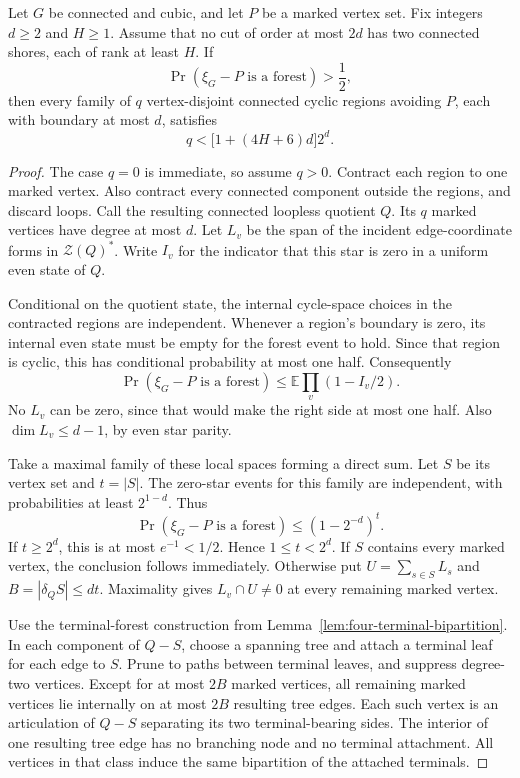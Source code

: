 \begin{proposition}
\label{prop:four-excess-free-cycle-packing}
Let $G$ be connected and cubic, and let $P$ be a marked vertex set.
Fix integers $d\ge2$ and $H\ge1$.
Assume that no cut of order at most $2d$ has two connected shores, each of rank at least $H$.
If
\[
 \Pr(\xi_G-P\text{ is a forest})>\frac12,
\]
then every family of $q$ vertex-disjoint connected cyclic regions avoiding $P$, each with boundary at most $d$, satisfies
\[
 q<\bigl[1+(4H+6)d\bigr]2^d.
\]
\end{proposition}

\begin{proof}
The case $q=0$ is immediate, so assume $q>0$.
Contract each region to one marked vertex.
Also contract every connected component outside the regions, and discard loops.
Call the resulting connected loopless quotient $Q$.
Its $q$ marked vertices have degree at most $d$.
Let $L_v$ be the span of the incident edge-coordinate forms in $\mathcal Z(Q)^*$.
Write $I_v$ for the indicator that this star is zero in a uniform even state of $Q$.

Conditional on the quotient state, the internal cycle-space choices in the contracted regions are independent.
Whenever a region's boundary is zero, its internal even state must be empty for the forest event to hold.
Since that region is cyclic, this has conditional probability at most one half.
Consequently
\[
 \Pr(\xi_G-P\text{ is a forest})
 \le\mathbb E\prod_v(1-I_v/2).
\]
No $L_v$ can be zero, since that would make the right side at most one half.
Also $\dim L_v\le d-1$, by even star parity.

Take a maximal family of these local spaces forming a direct sum.
Let $S$ be its vertex set and $t=|S|$.
The zero-star events for this family are independent, with probabilities at least $2^{1-d}$.
Thus
\[
 \Pr(\xi_G-P\text{ is a forest})
 \le(1-2^{-d})^t.
\]
If $t\ge2^d$, this is at most $e^{-1}<1/2$.
Hence $1\le t<2^d$.
If $S$ contains every marked vertex, the conclusion follows immediately.
Otherwise put $U=\sum_{s\in S}L_s$ and $B=|\delta_Q S|\le dt$.
Maximality gives $L_v\cap U\ne0$ at every remaining marked vertex.

Use the terminal-forest construction from Lemma~\ref{lem:four-terminal-bipartition}.
In each component of $Q-S$, choose a spanning tree and attach a terminal leaf for each edge to $S$.
Prune to paths between terminal leaves, and suppress degree-two vertices.
Except for at most $2B$ marked vertices, all remaining marked vertices lie internally on at most $2B$ resulting tree edges.
Each such vertex is an articulation of $Q-S$ separating its two terminal-bearing sides.
The interior of one resulting tree edge has no branching node and no terminal attachment.
All vertices in that class induce the same bipartition of the attached terminals.


\end{proof}
